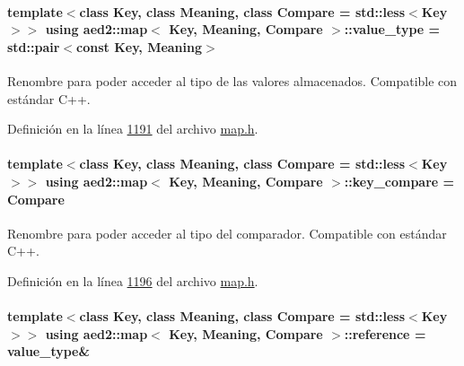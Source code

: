 \paragraph[{\texorpdfstring{value\+\_\+type}{value_type}}]{\setlength{\rightskip}{0pt plus 5cm}template$<$class Key, class Meaning, class Compare = std\+::less$<$\+Key$>$$>$ using {\bf aed2\+::map}$<$ Key, Meaning, Compare $>$\+::{\bf value\+\_\+type} =  std\+::pair$<$const Key, Meaning$>$}\hypertarget{classaed2_1_1map_a719db98e0ff9a837610f76be33264680_a719db98e0ff9a837610f76be33264680}{}\label{classaed2_1_1map_a719db98e0ff9a837610f76be33264680_a719db98e0ff9a837610f76be33264680}


Renombre para poder acceder al tipo de las valores almacenados. Compatible con estándar C++. 



Definición en la línea \hyperlink{map_8h_source_l01191}{1191} del archivo \hyperlink{map_8h_source}{map.\+h}.

\paragraph[{\texorpdfstring{key\+\_\+compare}{key_compare}}]{\setlength{\rightskip}{0pt plus 5cm}template$<$class Key, class Meaning, class Compare = std\+::less$<$\+Key$>$$>$ using {\bf aed2\+::map}$<$ Key, Meaning, Compare $>$\+::{\bf key\+\_\+compare} =  Compare}\hypertarget{classaed2_1_1map_a3efa081d3379ab76f33a5ef9fe697523_a3efa081d3379ab76f33a5ef9fe697523}{}\label{classaed2_1_1map_a3efa081d3379ab76f33a5ef9fe697523_a3efa081d3379ab76f33a5ef9fe697523}


Renombre para poder acceder al tipo del comparador. Compatible con estándar C++. 



Definición en la línea \hyperlink{map_8h_source_l01196}{1196} del archivo \hyperlink{map_8h_source}{map.\+h}.

\paragraph[{\texorpdfstring{reference}{reference}}]{\setlength{\rightskip}{0pt plus 5cm}template$<$class Key, class Meaning, class Compare = std\+::less$<$\+Key$>$$>$ using {\bf aed2\+::map}$<$ Key, Meaning, Compare $>$\+::{\bf reference} =  {\bf value\+\_\+type}\&}\hypertarget{classaed2_1_1map_af4f147533b3c0207ab036c86ce13ec0d_af4f147533b3c0207ab036c86ce13ec0d}{}\label{classaed2_1_1map_af4f147533b3c0207ab036c86ce13ec0d_af4f147533b3c0207ab036c86ce13ec0d}


